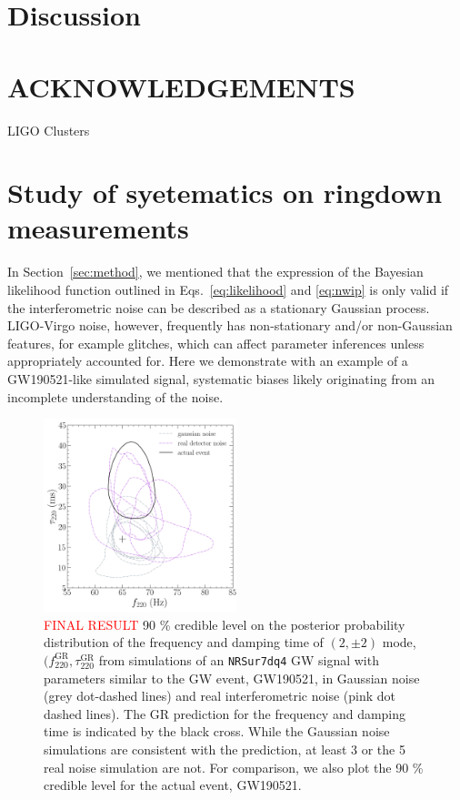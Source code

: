 \documentclass[twocolumn,prd,superscriptaddress,amsfonts,amssymb,amsmath,preprintnumbers]{revtex4-1}
\newcommand{\fgr}[1]{f ^{\text{GR}}_{\text{#1}}}
\newcommand{\taugr}[1]{\tau ^{\text{GR}}_{\text{#1}}}
\begin{document}
\section{Discussion}\label{sec:discussion}

\section*{ACKNOWLEDGEMENTS}\label{sec:acknowledgements}
LIGO Clusters


\appendix
\section{Study of syetematics on ringdown measurements}\label{sec:noise_systematics}

In Section~\ref{sec:method}, we mentioned that the expression of the Bayesian likelihood function outlined in Eqs.~\ref{eq:likelihood} and \ref{eq:nwip} is only valid if the interferometric noise can be described as a stationary Gaussian process. LIGO-Virgo noise, however, frequently has non-stationary and/or non-Gaussian features, for example glitches, which can affect parameter inferences unless appropriately accounted for. Here we demonstrate with an example of a GW190521-like simulated signal, systematic biases likely originating from an incomplete understanding of the noise. 

\begin{figure}
\begin{center}
	\includegraphics[width=0.5\textwidth]{figures/S190521g_swinjs.png}
	\caption{\textcolor{red}{FINAL RESULT} 90 \% credible level on the posterior probability distribution of the frequency and damping time of $(2,\pm 2)$ mode, $(\fgr{220}, \taugr{220}$ from simulations of an \texttt{NRSur7dq4} GW signal with parameters similar to the GW event, GW190521, in Gaussian noise (grey dot-dashed lines) and real interferometric noise (pink dot dashed lines). The GR prediction for the frequency and damping time is indicated by the black cross. While the Gaussian noise simulations are consistent with the prediction, at least 3 or the 5 real noise simulation are not. For comparison, we also plot the 90 \% credible level for the actual event, GW190521.}
	\label{fig:21g_systematics}
\end{center}	
\end{figure}
\end{document}
